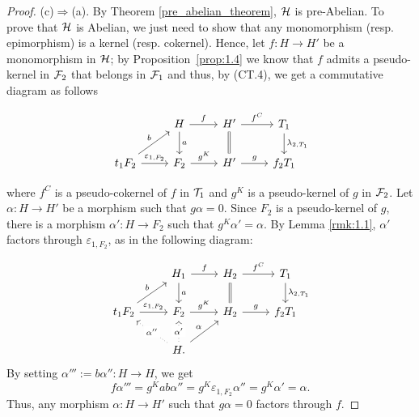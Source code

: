 \begin{proof}
\smallskip\noindent
\begin{sloppypar}
(c)$\Rightarrow$(a). By Theorem \ref{pre_abelian_theorem}, $\mathcal{H}$ is pre-Abelian. To prove that $\mathcal{H}$ is Abelian, we just need to show that any monomorphism (resp. epimorphism) is a kernel (resp. cokernel).
Hence, let ${f\colon H\to H'}$ be a monomorphism in $\mathcal{H}$; by Proposition~\ref{prop:1.4}
we know that $f$ admits a pseudo-kernel in $\mathcal{F}_2$ that belongs in $\mathcal{F}_1$ and thus, by (CT.4), we get a commutative diagram as follows
\end{sloppypar}
\begingroup
\setlength{\abovedisplayskip}{0pt}
\begin{equation*}
\begin{tikzcd}
 & H\arrow{r}{f}\arrow{d}{a} & H'\arrow{r}{f^C}\arrow[equal]{d} & T_1\arrow{d}{\lambda_{2,T_1}}\\
t_1F_2\arrow{ur}{b}\arrow{r}{\varepsilon_{1,F_2}} & F_2\arrow{r}{g^K} & H'\arrow{r}{g} & f_2T_1
\end{tikzcd}
\end{equation*}
\endgroup
\begin{sloppypar}
where $f^C$  is a pseudo-cokernel of $f$ in $\mathcal{T}_1$ and $g^K$ is a pseudo-kernel of $g$ in $\mathcal{F}_2$. Let $\alpha\colon H\to H'$ be a morphism such that ${g\alpha =0}$. Since $F_2$ is a pseudo-kernel of $g$, there is a morphism $\alpha'\colon H\to F_2$ such that $g^K\alpha'=\alpha$. By Lemma \ref{rmk:1.1}, $\alpha'$ factors through  $\varepsilon_{1,F_2}$, as in the following diagram:
\end{sloppypar}
\begingroup
\setlength{\abovedisplayskip}{0pt}
\begin{equation*}
\begin{tikzcd}
& H_1\arrow{r}{f}\arrow{d}{a} & H_2\arrow{r}{f^C}\arrow[equal]{d}& T_1\arrow{d}{\lambda_{2,T_1}}\\
t_1F_2\arrow{ur}{b}\arrow{r}{\varepsilon_{1,F_2}} & F_2\arrow{r}{g^K} & H_2\arrow{r}{g} & f_2T_1\\
& H.\arrow{ur}{\alpha}\arrow[dotted]{u}[description]{\alpha'}\arrow[dotted]{ul}[description]{\alpha''} & &
\end{tikzcd}
\end{equation*}
\endgroup
By setting $\alpha''' := b\alpha''\colon H\to H$, we get \[f\alpha''' = g^K ab\alpha'' = g^K\varepsilon_{1,F_2}\alpha''=g^K\alpha' = \alpha.\] Thus, any morphism $\alpha\colon H \to H'$ such that $g\alpha =0$ factors through $f$.
\end{proof}







